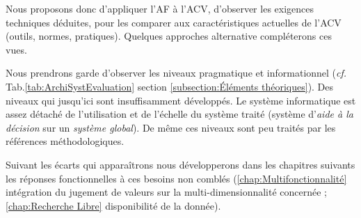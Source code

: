 Nous proposons donc d'appliquer l'\gls{AF} à l'\gls{ACV}, d'observer les exigences techniques déduites, pour les comparer aux caractéristiques actuelles de l'\gls{ACV} (outils, normes, pratiques).
Quelques approches alternative compléterons ces vues.

Nous prendrons garde d'observer les niveaux pragmatique et informationnel (\textit{cf.} Tab.\ref{tab:ArchiSystEvaluation} section \ref{subsection:Éléments théoriques}).
Des niveaux qui jusqu'ici sont insuffisamment développés.
Le système informatique est assez détaché de l'utilisation et de l'échelle du système traité (système d'\textit{aide à la décision} sur un \textit{système global}).
De même ces niveaux sont peu traités par les références méthodologiques.


Suivant les écarts qui apparaîtrons nous développerons dans les chapitres suivants les réponses fonctionnelles à ces besoins non comblés (\ref{chap:Multifonctionnalité} intégration du jugement de valeurs sur la multi-dimensionnalité concernée ; \ref{chap:Recherche Libre} disponibilité de la donnée).






